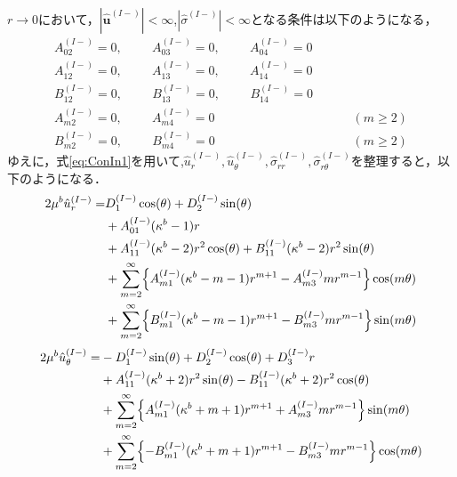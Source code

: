 $r\rightarrow0$において，$|\hat{\bm{u}}^{(I-)}|<\infty$,$|\hat{\sigma}^{(I-)}|<\infty$となる条件は以下のようになる，
\begin{align}
	A_{02}^{(I-)}=0,\hspace{1cm}A_{03}^{(I-)}=0,\hspace{1cm}A_{04}^{(I-)}=0&
	\nonumber
	\\
	A_{12}^{(I-)}=0,\hspace{1cm}A_{13}^{(I-)}=0,\hspace{1cm}A_{14}^{(I-)}=0&
	\nonumber
	\\
	B_{12}^{(I-)}=0,\hspace{1cm}B_{13}^{(I-)}=0,\hspace{1cm}B_{14}^{(I-)}=0&
	\nonumber
	\\
	A_{m2}^{(I-)}=0,\hspace{1cm}A_{m4}^{(I-)}=0&\hspace{1cm}(m\geq2)
	\nonumber
	\\
	B_{m2}^{(I-)}=0,\hspace{1cm}B_{m4}^{(I-)}=0&\hspace{1cm}(m\geq2)
	\label{eq:ConIn1}
\end{align}
ゆえに，式\eqref{eq:ConIn1}を用いて,$\hat{u}_{r}^{(I-)},\hat{u}_{\theta}^{(I-)},\hat{\sigma}_{rr}^{(I-)},\hat{\sigma}_{r\theta}^{(I-)}$を整理すると，以下のようになる．
\begin{align}
	2\mu^{b}\hat{u}_{r}^{(I-)} =&D_{1}^{(I-)}\cos(\theta)+D_{2}^{(I-)}\sin(\theta)
	\nonumber
	\\
	&+A_{01}^{(I-)}(\kappa^{b}-1)r
	\nonumber
	\\
	&+A_{11}^{(I-)}(\kappa^{b}-2)r^2\cos(\theta)
	+B_{11}^{(I-)}(\kappa^{b}-2)r^2\sin(\theta)
	\nonumber
	\\
	&+\sum_{m=2}^{\infty}\Bigl\{A_{m1}^{(I-)}(\kappa^{b}-m-1)r^{m+1}
	-A_{m3}^{(I-)}mr^{m-1}\Bigr\}\cos(m\theta)
	\nonumber
	\\
	&+\sum_{m=2}^{\infty}\Bigl\{B_{m1}^{(I-)}(\kappa^{b}-m-1)r^{m+1}
	-B_{m3}^{(I-)}mr^{m-1}\Bigr\}\sin(m\theta)
	\label{eq:URIn1}
\end{align}
\begin{align}
	2\mu^{b}\hat{u}_{\theta}^{(I-)} =&-D_{1}^{(I-)}\sin(\theta)+D_{2}^{(I-)}\cos(\theta)+D_{3}^{(I-)}r
	\nonumber
	\\
	&+A_{11}^{(I-)}(\kappa^{b}+2)r^2\sin(\theta)
	-B_{11}^{(I-)}(\kappa^{b}+2)r^2\cos(\theta)
	\nonumber
	\\
	&+\sum_{m=2}^{\infty}\Bigl\{A_{m1}^{(I-)}(\kappa^{b}+m+1)r^{m+1}
	+A_{m3}^{(I-)}mr^{m-1}\Bigr\}\sin(m\theta)
	\nonumber
	\\
	&+\sum_{m=2}^{\infty}\Bigl\{-B_{m1}^{(I-)}(\kappa^{b}+m+1)r^{m+1}
	-B_{m3}^{(I-)}mr^{m-1}\Bigr\}\cos(m\theta)
	\label{eq:UThIn1}
\end{align}
